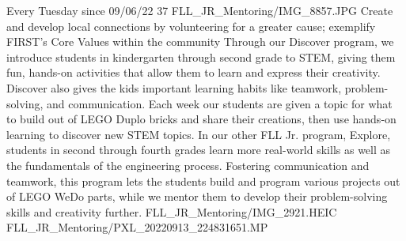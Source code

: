 {Every Tuesday since 09/06/22}
{37}
{FLL_JR_Mentoring/IMG_8857.JPG}
{Create and develop local connections by volunteering for a greater cause; exemplify FIRST's Core Values within the community} 
{Through our Discover program, we introduce students in kindergarten through second grade to STEM, giving them fun, hands-on activities that allow them to learn and express their creativity. Discover also gives the kids important learning habits like teamwork, problem-solving, and communication. Each week our students are given a topic for what to build out of LEGO Duplo bricks and share their creations, then use hands-on learning to discover new STEM topics. In our other FLL Jr. program, Explore, students in second through fourth grades learn more real-world skills as well as the fundamentals of the engineering process. Fostering communication and teamwork, this program lets the students build and program various projects out of LEGO WeDo parts, while we mentor them to develop their problem-solving skills and creativity further.
} 
{FLL_JR_Mentoring/IMG_2921.HEIC}
{FLL_JR_Mentoring/PXL_20220913_224831651.MP}
